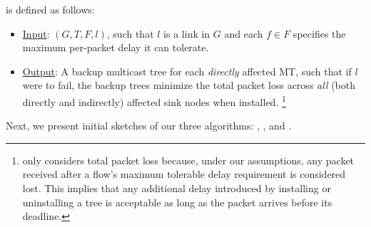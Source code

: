 
{\bf \myopic} 

\myopic is defined as follows:
\begin{itemize}
	\item  \underline{Input}: $(G,T,F,l)$, such that $l$ is a link in $G$ and each $f \in F$ specifies the maximum per-packet delay it can tolerate.

	\item \underline{Output}: A backup multicast tree for each \emph{directly} affected MT, such that if $l$ were to fail, the backup trees minimize the total packet loss across \emph{all} (both directly and indirectly) affected  sink nodes when installed.
	\footnote{\myopic only considers total packet loss because, under our assumptions, any packet received after a flow's maximum tolerable delay requirement is considered lost. 
	This implies that any additional delay introduced by installing or uninstalling a tree is acceptable as long as the packet arrives before its deadline.}
\end{itemize}
\vspace{-0.3cm}
Next, we present initial sketches of our three \myopic algorithms: \mcs, \mfs, and \mds.


